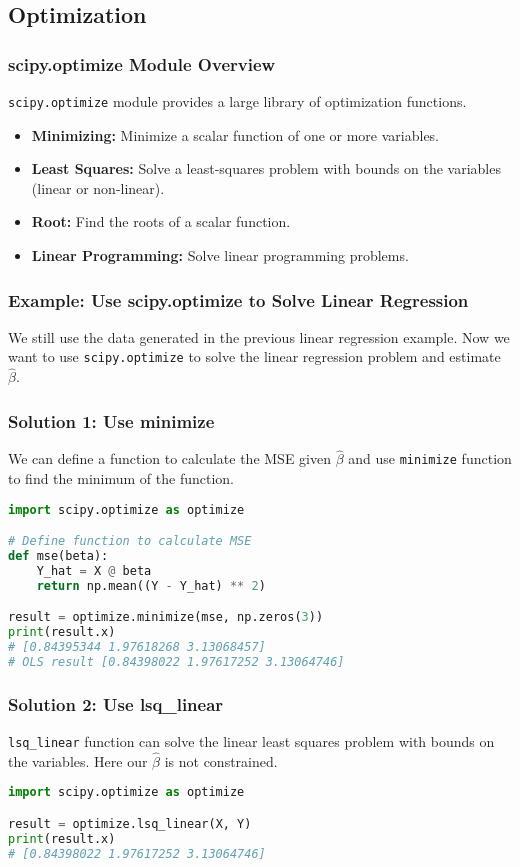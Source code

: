 \documentclass[beamer, en, version=2.0]{huangfusl-template}
\begin{document}
    \subsection{Optimization}
    \begin{frame}[fragile]
        \frametitle{{\normalsize\ttfamily scipy.optimize} Module Overview}

        {\footnotesize\verb|scipy.optimize|} module provides a large library of optimization functions.

        \begin{itemize}
            \item \textbf{Minimizing:} Minimize a scalar function of one or more variables.
            \item \textbf{Least Squares:} Solve a least-squares problem with bounds on the variables (linear or non-linear).
            \item \textbf{Root:} Find the roots of a scalar function.
            \item \textbf{Linear Programming:} Solve linear programming problems.
        \end{itemize}
    \end{frame}
    \begin{frame}[fragile]
        \frametitle{Example: Use {\normalsize\ttfamily scipy.optimize} to Solve Linear Regression}

        We still use the data generated in the previous linear regression example. Now we want to use {\footnotesize\verb|scipy.optimize|} to solve the linear regression problem and estimate $\hat\beta$.
    \end{frame}
    \begin{frame}[fragile]
        \frametitle{Solution 1: Use {\normalsize\ttfamily minimize}}

        We can define a function to calculate the MSE given $\hat\beta$ and use {\color{blue}\footnotesize\verb|minimize|} function to find the minimum of the function.

\begin{lstlisting}[language=python]
import scipy.optimize as optimize

# Define function to calculate MSE
def mse(beta):
    Y_hat = X @ beta
    return np.mean((Y - Y_hat) ** 2)

result = optimize.minimize(mse, np.zeros(3))
print(result.x)
# [0.84395344 1.97618268 3.13068457]
# OLS result [0.84398022 1.97617252 3.13064746]
\end{lstlisting}
    \end{frame}
    \begin{frame}[fragile]
        \frametitle{Solution 2: Use {\normalsize\ttfamily lsq\_linear}}

        {\color{blue}\footnotesize\verb|lsq_linear|} function can solve the linear least squares problem with bounds on the variables. Here our $\hat\beta$ is not constrained.

\begin{lstlisting}[language=python]
import scipy.optimize as optimize

result = optimize.lsq_linear(X, Y)
print(result.x)
# [0.84398022 1.97617252 3.13064746]
\end{lstlisting}
    \end{frame}
\end{document}
